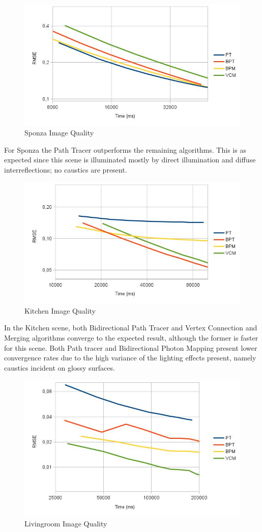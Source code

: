 \begin{figure}[H]
\centering
\includegraphics[width=0.8\linewidth]{img/sponzaImgq.jpg}
\caption{\label{img:sponzaImgq} Sponza Image Quality}
\end{figure}

For Sponza the Path Tracer outperforms the remaining algorithms. This is as expected since this scene is illuminated mostly by direct illumination and diffuse interreflections; no caustics are present.

\begin{figure}[H]
\centering
\includegraphics[width=0.8\linewidth]{img/kitchenImgq.jpg}
\caption{\label{img:kitchenImgq} Kitchen Image Quality}
\end{figure}

In the Kitchen scene, both Bidirectional Path Tracer and Vertex Connection and Merging algorithms converge to the expected result, although the former is faster for this scene. Both Path tracer and Bidirectional Photon Mapping present lower convergence rates due to the high variance of the lighting effects present, namely caustics incident on glossy surfaces.

\begin{figure}[H]
\centering
\includegraphics[width=0.8\linewidth]{img/livingroomImgq.jpg}
\caption{\label{img:livingroomImgq} Livingroom Image Quality}
\end{figure}


